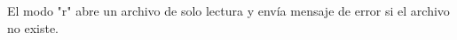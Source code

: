 
\question \tf[V] El modo "r" abre un archivo de solo lectura y envía mensaje
          de error si el archivo no existe.
